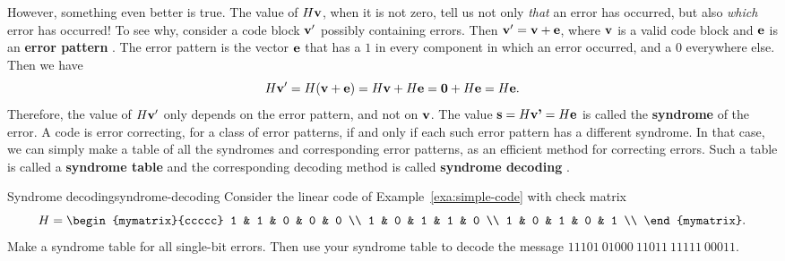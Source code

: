 However, something even better is true. The value of $H\mbox{\bf v}$, when
it is not zero, tell us not only {\em that} an error has occurred, but
also {\em which} error has occurred! To see why, consider a code block
$\mbox{\bf v}'$ possibly containing errors. Then
$\mbox{\bf v}' = \mbox{\bf v} + \mbox{\bf e}$, where $\mbox{\bf v}$ is a valid code
block and $\mbox{\bf e}$ is an \textbf{error pattern}%
%
%
. The error pattern is the vector
$\mbox{\bf e}$ that has a $1$ in every component in which an error
occurred, and a $0$ everywhere else.  Then we have
\begin{equation*}
  H\mbox{\bf v}' = H(\mbox{\bf v} + \mbox{\bf e}) = H\mbox{\bf v} + H\mbox{\bf e} =
  \mbox{\bf 0} + H\mbox{\bf e} = H\mbox{\bf e}.
\end{equation*}
Therefore, the value of $H\mbox{\bf v}'$ only depends on the error
pattern, and not on $\mbox{\bf v}$. The value
$\mbox{\bf s} = H\mbox{\bf v'} = H\mbox{\bf e}$ is called the \textbf{syndrome}%
%
%
 of the error. A code is error correcting,
for a class of error patterns, if and only if each such error pattern
has a different syndrome. In that case, we can simply make a table of
all the syndromes and corresponding error patterns, as an efficient
method for correcting errors. Such a table is called a
\textbf{syndrome table}%
%
%
 and the corresponding decoding
method is called \textbf{syndrome decoding}%
%
%
.

\begin{example}{Syndrome decoding}{syndrome-decoding}
  Consider the linear code of Example~\ref{exa:simple-code} with check
  matrix
  \begin{equation*}
    H = \begin{mymatrix}{ccccc}
      1 & 1 & 0 & 0 & 0 \\
      1 & 0 & 1 & 1 & 0 \\
      1 & 0 & 1 & 0 & 1 \\
    \end{mymatrix}.
  \end{equation*}
  Make a syndrome table for all single-bit errors.  Then use your
  syndrome table to decode the message
  $11101~01000~11011~11111~00011$.
\end{example}

